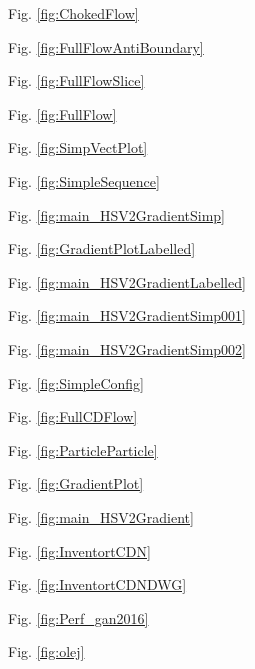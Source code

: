 Fig. \ref{fig:ChokedFlow}

Fig. \ref{fig:FullFlowAntiBoundary}

Fig. \ref{fig:FullFlowSlice}

Fig. \ref{fig:FullFlow}

Fig. \ref{fig:SimpVectPlot}

Fig. \ref{fig:SimpleSequence}

Fig. \ref{fig:main_HSV2GradientSimp}

Fig. \ref{fig:GradientPlotLabelled}

Fig. \ref{fig:main_HSV2GradientLabelled}

Fig. \ref{fig:main_HSV2GradientSimp001}

Fig. \ref{fig:main_HSV2GradientSimp002}

Fig. \ref{fig:SimpleConfig}

Fig. \ref{fig:FullCDFlow}

Fig. \ref{fig:ParticleParticle}

Fig. \ref{fig:GradientPlot}

Fig. \ref{fig:main_HSV2Gradient}

Fig. \ref{fig:InventortCDN}

Fig. \ref{fig:InventortCDNDWG}

Fig. \ref{fig:Perf_gan2016}

Fig. \ref{fig:olej}

